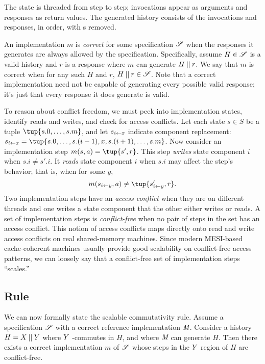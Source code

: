 \noindent The state is threaded from step to step;
invocations appear as arguments and responses as
return values. The generated history consists of the invocations
and responses, in order, with \POLL{}s removed.

An implementation $m$ is \emph{correct} for some specification $\mathscr{S}$
when the responses it generates are always allowed by the specification.
Specifically, assume $H \in \mathscr{S}$ is a valid history and
$r$ is a response where $m$ can generate $H \mathbin{||} r$.
We say that $m$ is correct when for any such $H$ and $r$, $H
\mathbin{||} r \in \mathscr{S}$. Note that a correct implementation need not be
capable of generating
every possible valid response; it's just that every response it does
generate is valid.

To reason about conflict freedom, we must peek into
implementation states, identify reads and writes, and check for access
conflicts.
%
Let each state $s \in S$ be a tuple $\tup{s.0, \dots, s.m}$, and let
%
$s_{i\gets x}$ indicate component
replacement: $\tupleadj{s}{i}{x} = \tup{s.0,\dots,s.(i-1),x,s.(i+1),\dots,s.m}$.
%
Now consider an implementation step $m(s,a) = \tup{s', r}$.
%
This step \emph{writes} state component $i$
when $s.i \neq s'.i$.
%
It \emph{reads} state component $i$ when $s.i$ may affect the
step's behavior; that is, when for some $y$,
%
\[m(\tupleadj{s}{i}{y},a) \neq \tup{\tupleadj{s'}{i}{y}, r}.\]
%
Two implementation steps have an \emph{access conflict} when they are on
different threads and one writes a state component that the other either
writes or reads.
%
A set of implementation steps is \emph{conflict-free}
when no pair of steps in the set has an access conflict.
%
This notion of access conflicts maps directly onto read and write access
conflicts on real shared-memory machines. Since modern MESI-based
cache-coherent machines
usually provide good scalability on conflict-free access patterns,
we can loosely say that a conflict-free set of implementation steps
``scales.''


\subsection{Rule}

We can now formally state the scalable commutativity rule.
%
Assume a specification $\mathscr{S}$ with a correct reference implementation
$\textit{M}$.
%
Consider a history $H = X \mathbin{||} Y$ where $Y$ \SRI-commutes in $H$,
and where $\textit{M}$ can generate $H$.
%
Then there exists a correct implementation $m$ of $\mathscr{S}$ whose steps in
the $Y$ region of $H$ are conflict-free.

